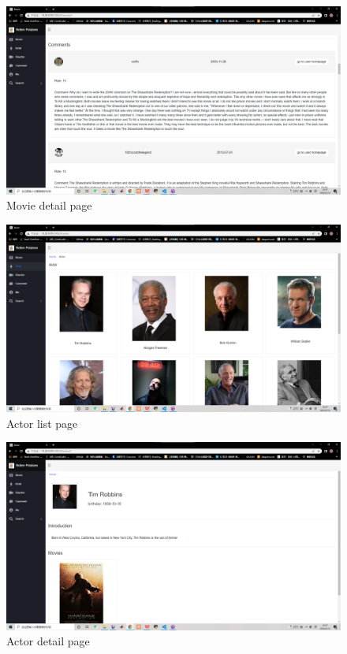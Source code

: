 \begin{CJK*}{UTF8}{gbsn}
    \begin{figure}[htbp]
    \centering
    \includegraphics[width=1\textwidth]{res_movie4.png}
    \caption{Movie detail page}
    \end{figure}
    
    \begin{figure}[htbp]
    \centering
    \includegraphics[width=1\textwidth]{res_actor1.png}
    \caption{Actor list page}
    \end{figure}
    
    \begin{figure}[htbp]
    \centering
    \includegraphics[width=1\textwidth]{res_actor2.png}
    \caption{Actor detail page}
    \end{figure}
    

\end{CJK*}
